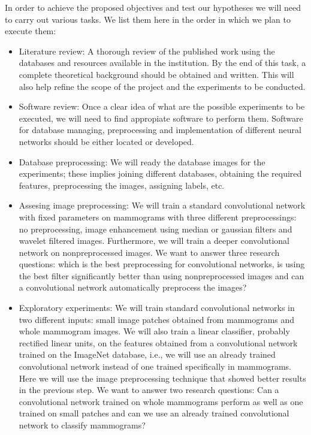 In order to achieve the proposed objectives and test our hypotheses we will need to carry out various tasks. We list them here in the order in which we plan to execute them: %

\begin{itemize}
	\item Literature review: A thorough review of the published work using the databases and resources available in the institution. By the end of this task, a complete theoretical background should be obtained and written. This will also help refine the scope of the project and the experiments to be conducted.
	\item Software review: Once a clear idea of what are the possible experiments to be executed, we will need to find appropiate software to perform them. Software for database managing, preprocessing and implementation of different neural networks should be either located or developed.
	\item Database preprocessing: We will ready the database images for the experiments; these implies joining different databases, obtaining the required features, preprocessing the images, assigning labels, etc.
	\item Assesing image preprocessing: We will train a standard convolutional network with fixed parameters on mammograms with three different preprocessings: no preprocessing, image enhancement using median or gaussian filters and wavelet filtered images. Furthermore, we will train a deeper convolutional network on nonpreprocessed images. We want to answer three research questions: which is the best preprocessing for convolutional networks, is using the best filter significantly better than using nonpreprocessed images and can a convolutional network automatically preprocess the images?
	\item Exploratory experiments: We will train standard convolutional networks in two different inputs: small image patches obtained from mammograms and whole mammogram images. We will also train a linear classifier, probably rectified linear units, on the features obtained from a convolutional network trained on the ImageNet database, i.e., we will use an already trained convolutional network instead of one trained specifically in mammograms. Here we will use the image preprocessing technique that showed better results in the previous step. We want to answer two research questions: Can a convolutional network trained on whole mammograms perform as well as one trained on small patches and can we use an already trained convolutional network to classify mammograms?

\end{itemize}
